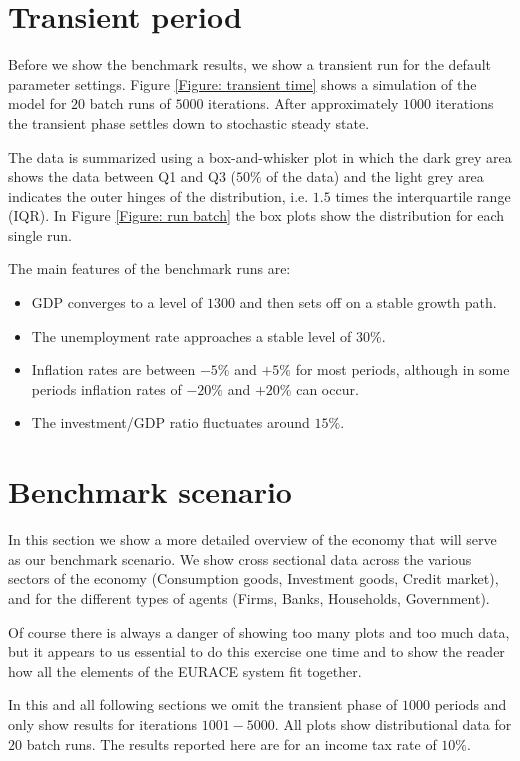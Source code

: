 \section{Transient period}
Before we show the benchmark results, we show a transient run for the default parameter settings.
Figure \ref{Figure: transient time} shows a simulation of the model for $20$ batch runs of $5000$ iterations.
After approximately $1000$ iterations the transient phase settles down to stochastic steady state.

The data is summarized using a box-and-whisker plot in which the dark grey area shows the data between Q1 and Q3 ($50\%$ of the data) and
 the light grey area indicates the outer hinges of the distribution, i.e. $1.5$ times the interquartile range (IQR).
In Figure \ref{Figure: run batch} the box plots show the distribution for each single run.

\bigskip
The main features of the benchmark runs are:
\begin{itemize}
\item GDP converges to a level of $1300$ and then sets off on a stable growth path.
\item The unemployment rate approaches a stable level of $30\%$.
\item Inflation rates are between $-5\%$ and $+5\%$ for most periods,
although in some periods inflation rates of $-20\%$ and $+20\%$ can occur.
\item The investment/GDP ratio fluctuates around $15\%$.
\end{itemize}

\section{Benchmark scenario}
In this section we show a more detailed overview of the economy that will serve as our benchmark scenario.
We show cross sectional data across the various sectors of the economy (Consumption goods, Investment goods, Credit market),
and for the different types of agents (Firms, Banks, Households, Government). 

Of course there is always a danger of showing too many plots and too much data,
but it appears to us essential to do this exercise one time and to show the reader how
all the elements of the EURACE system fit together.

In this and all following sections we omit the transient phase of $1000$ periods and only show results for iterations $1001-5000$.
All plots show distributional data for $20$ batch runs. The results reported here are for an income tax rate of $10\%$.

